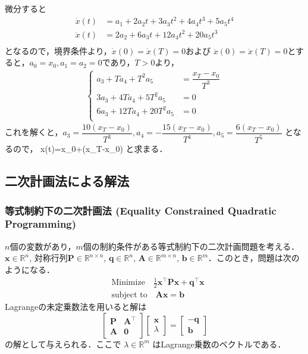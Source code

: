 微分すると 
\begin{align}
\dot{x}(t)&=a_1 + 2a_2 t+3a_3 t^2+4a_4 t^3+5a_5 t^4\\
\ddot{x}(t)&=2a_2+6a_3 t+12a_4 t^2+20a_5 t^3\\
\end{align}
となるので，境界条件より，$\dot{x}(0)=\dot{x}(T)=0$および $\ddot{x}(0)=\ddot{x}(T)=0$とすると，$a_0=x_0, a_1=a_2=0$であり，$T>0$より，
\begin{align}
\begin{cases}
a_3+T a_4 +T^2 a_5 &=\dfrac{x_T-x_0}{T^3}\\
3a_3 +4T a_4 +5T^2 a_5 &=0\\
6a_3+12T a_4 +20T^2 a_5 &=0\\
\end{cases}
\end{align}
これを解くと，$a_3=\dfrac{10(x_T-x_0)}{T^3}, a_4=-\dfrac{15(x_T-x_0)}{T^4}, a_5=\dfrac{6(x_T-x_0)}{T^5}$
となるので，
x(t)=x_0+(x_T-x_0) 
と求まる．
\subsection{二次計画法による解法}
\subsubsection{等式制約下の二次計画法 (Equality Constrained Quadratic Programming)}
$n$個の変数があり，$m$個の制約条件がある等式制約下の二次計画問題を考える．$\mathbf {x}\in \mathbb{R}^n$, 対称行列$\mathbf{P}\in \mathbb{R}^{n\times n}$,  $\mathbf {q}\in \mathbb{R}^{n}$, $\mathbf{A}\in \mathbb{R}^{m\times n}$, $\mathbf {b}\in \mathbb{R}^m$．このとき，問題は次のようになる．
\begin{align}
&{\text{Minimize}}\quad {\frac {1}{2}}\mathbf {x}^\top \mathbf{P}\mathbf {x} +\mathbf {q} ^{\top}\mathbf {x}\\
&{\text{subject to}}\quad \mathbf{A}\mathbf {x} =\mathbf {b}
\end{align}
Lagrangeの未定乗数法を用いると解は
\begin{equation}
{\begin{bmatrix}\mathbf{P}&\mathbf{A}^\top\\\mathbf{A}&\mathbf{0}\end{bmatrix}}{\begin{bmatrix}\mathbf {x} \\
\lambda \end{bmatrix}}={\begin{bmatrix}-\mathbf {q} \\\mathbf {b} \end{bmatrix}}
\end{equation}
の解として与えられる．ここで $\lambda \in \mathbb{R}^{m}$ はLagrange乗数のベクトルである．
